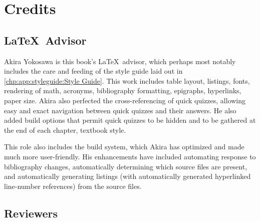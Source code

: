 
\chapter{Credits}
\label{bck:ack:Credits}
%



\section{\LaTeX\ Advisor}

Akira Yokosawa is this book's \LaTeX\ advisor, which perhaps most
notably includes the care and feeding of the style guide laid out
in \cref{chp:app:styleguide:Style Guide}.
This work includes table layout, listings, fonts, rendering of math,
acronyms, bibliography formatting, epigraphs, hyperlinks, paper size.
Akira also perfected the cross-referencing of quick quizzes, allowing
easy and exact navigation between quick quizzes and their answers.
He also added build options that permit quick quizzes to be hidden
and to be gathered at the end of each chapter, textbook style.

This role also includes the build system, which Akira has optimized and
made much more user-friendly.
His enhancements have included automating response to bibliography
changes, automatically determining which source files are present,
and automatically generating listings (with automatically generated
hyperlinked line-number references) from the source files.

\section{Reviewers}

